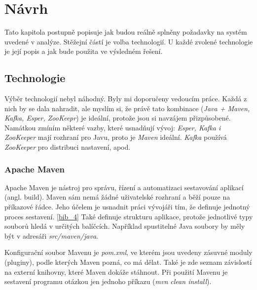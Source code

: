 \documentclass[
  digital, %
  table,   %
  nolof,     %
  nolot,     %
  oneside, %
  nocover,
  monochrome,
  12pt
]{fithesis3}
\begin{document}
\chapter{Návrh}
Tato kapitola postupně popisuje jak budou reálně splněny požadavky na systém uvedené v analýze. Stěžejní částí je volba technologií. U každé zvolené technologie je její popis a jak bude použita ve výsledném řešení.

\section{Technologie}
Výběr technologií nebyl náhodný. Byly mi doporučeny vedoucím práce. Každá z nich by se dala nahradit, ale myslím si, že právě tato kombinace (\textit{Java + Maven, Kafka, Esper, ZooKeepr}) je ideální, protože jsou si navzájem přizpůsobené. Namátkou zmíním některé vazby, které usnadňují vývoj: \textit{Esper, Kafka i ZooKeeper} mají rozhraní pro Javu, proto je \textit{Maven} ideální. \textit{Kafka} používá \textit{ZooKeeper} pro distribuci nastavení, apod.

\subsection{Apache Maven}
Apache Maven je nástroj pro správu, řízení a automatizaci sestavování aplikací (angl. build). Maven sám nemá žádné uživatelské rozhraní a běží pouze na příkazové řádce. Jeho účelem je usnadnit práci vývojáři tím, že definuje jednotný proces sestavení. \ref{bib_4} Také definuje strukturu aplikace, protože jednotlivé typy souborů hledá v určitých balíčcích. Například spustitelné Java soubory by měly být v adresáři \textit{src/maven/java}.

Konfigurační soubor Mavenu je \textit{pom.xml}, ve kterém jsou uvedeny zásuvné moduly (pluginy), podle kterých Maven pozná, co má dělat. Také je zde seznam závislostí na externí knihovny, které Maven dokáže stáhnout. Při použití Mavenu je sestavení programu otázkou jen jednoho příkazu (\textit{mvn clean install}).
\end{document}
